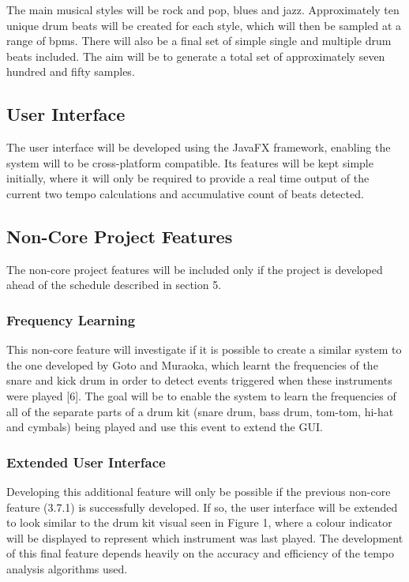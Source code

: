 \documentclass[a4paper, 11pt]{article}
\begin{document}
The main musical styles will be rock and pop, blues and jazz. Approximately ten unique drum beats will be created for each style, which will then be sampled at a range of bpms. There will also be a final set of simple single and multiple drum beats included. The aim will be to generate a total set of approximately seven hundred and fifty samples.

\subsection{User Interface}
The user interface will be developed using the JavaFX framework, enabling the system will to be cross-platform compatible. Its features will be kept simple initially, where it will only be required to provide a real time output of the current two tempo calculations and accumulative count of beats detected.

\subsection{Non-Core Project Features}
The non-core project features will be included only if the project is developed ahead of the schedule described in section 5. 

\subsubsection{Frequency Learning}
This non-core feature will investigate if it is possible to create a similar system to the one developed by Goto and Muraoka, which learnt the frequencies of the snare and kick drum in order to detect events triggered when these instruments were played [6]. The goal will be to enable the system to learn the frequencies of all of the separate parts of a drum kit (snare drum, bass drum, tom-tom, hi-hat and cymbals) being played and use this event to extend the GUI.

\subsubsection{Extended User Interface}
Developing this additional feature will only be possible if the previous non-core feature (3.7.1) is successfully developed. If so, the user interface will be extended to look similar to the drum kit visual seen in Figure 1, where a colour indicator will be displayed to represent which instrument was last played. The development of this final feature depends heavily on the accuracy and efficiency of the tempo analysis algorithms used.
\end{document}
